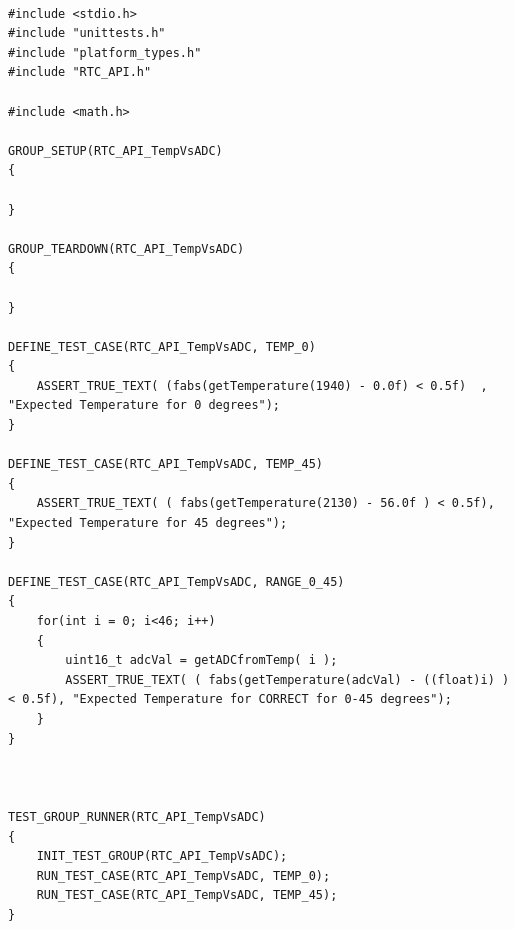 \documentclass{article}
\begin{document}
\lstset{style=mystyle}
	
	\begin{lstlisting}[caption={Unittests example}, label=code:unittests]

#include <stdio.h>
#include "unittests.h"
#include "platform_types.h"
#include "RTC_API.h"

#include <math.h>

GROUP_SETUP(RTC_API_TempVsADC)
{
	
}

GROUP_TEARDOWN(RTC_API_TempVsADC)
{
	
}

DEFINE_TEST_CASE(RTC_API_TempVsADC, TEMP_0)
{
	ASSERT_TRUE_TEXT( (fabs(getTemperature(1940) - 0.0f) < 0.5f)  , "Expected Temperature for 0 degrees");
}

DEFINE_TEST_CASE(RTC_API_TempVsADC, TEMP_45)
{
	ASSERT_TRUE_TEXT( ( fabs(getTemperature(2130) - 56.0f ) < 0.5f), "Expected Temperature for 45 degrees");
}

DEFINE_TEST_CASE(RTC_API_TempVsADC, RANGE_0_45)
{
	for(int i = 0; i<46; i++)
	{
		uint16_t adcVal = getADCfromTemp( i );
		ASSERT_TRUE_TEXT( ( fabs(getTemperature(adcVal) - ((float)i) ) < 0.5f), "Expected Temperature for CORRECT for 0-45 degrees");
	}
}



TEST_GROUP_RUNNER(RTC_API_TempVsADC)
{
	INIT_TEST_GROUP(RTC_API_TempVsADC);
	RUN_TEST_CASE(RTC_API_TempVsADC, TEMP_0);
	RUN_TEST_CASE(RTC_API_TempVsADC, TEMP_45);
}



	\end{lstlisting}
	
\end{document}
